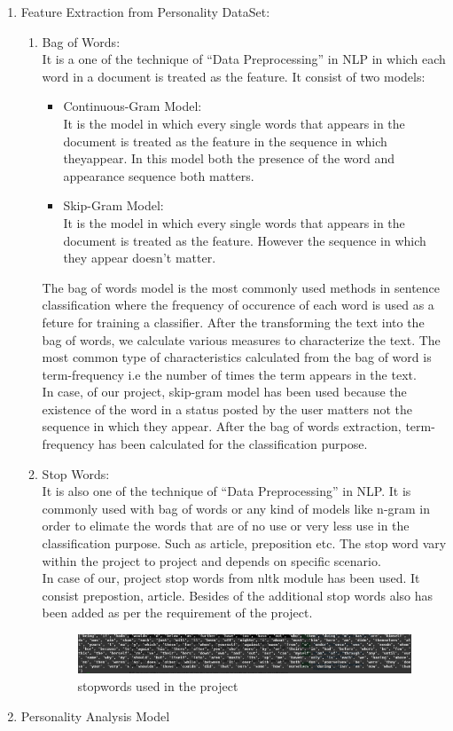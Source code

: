 \documentclass[a4paper, 12pt, onepage]{article}
\begin{document}
\begin{enumerate}
	\clearpage
	\item Feature Extraction from Personality DataSet:\\
	\begin{enumerate}
	\item Bag of Words:\\
		It is a one of the technique of ``Data Preprocessing'' in NLP in which each word in a document is treated as the feature. It consist of two models:
	\begin{itemize}
		\item Continuous-Gram Model:\\
			It is the model in which every single words that appears in the document is treated as the feature in the sequence in which theyappear. In this model both the presence of the word and appearance sequence both matters.
		\item Skip-Gram Model:\\
			It is the model in which every single words that appears in the document is treated as the feature. However the sequence in which they appear doesn't matter.
	\end{itemize}
	The bag of words model is the most commonly used methods in sentence classification where the frequency of occurence of each word is used as a feture for training a classifier. After the transforming the text into the bag of words, we calculate various measures to characterize the text. The most common type of characteristics calculated from the bag of word is term-frequency i.e the number of times the term appears in the text.\\
	In case, of our project, skip-gram model has been used because the existence of the word in a status posted by the user matters not the sequence in which they appear. After the bag of words extraction, term-frequency has been calculated for the classification purpose.
	\item Stop Words:\\
		It is also one of the technique of ``Data Preprocessing'' in NLP. It is commonly used with bag of words or any kind of models like n-gram in order to elimate the words that are of no use or very less use in the classification purpose. Such as article, preposition etc. The stop word vary within the project to project and depends on specific scenario.\\
		In case of our, project stop words from nltk module has been used. It consist prepostion, article. Besides of the additional stop words also has been added as per the requirement of the project.
	\clearpage
      \begin{figure}[ht!]
	      \includegraphics[width=600px]{stopWords.png}
		\caption{stopwords used in the project}
	\end{figure}
	\end{enumerate}
	\item Personality Analysis Model
	\end{enumerate}
\end{document}
